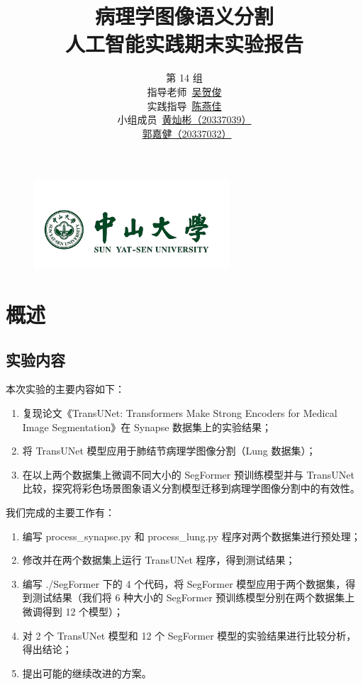\documentclass[hyperref,a4paper,UTF8]{ctexart}
\title{\vspace{3cm}\Huge\textbf{{病理学图像语义分割} \\ \LARGE{人工智能实践期末实验报告}}\vspace{6cm}}
\author{
\kaishu\Large{第 14 组} \\
\kaishu\Large{指导老师\ \underline{吴贺俊}} \\
\kaishu\Large{实践指导\ \underline{陈燕佳}} \\
\kaishu\Large{小组成员\ \underline{黄灿彬（20337039）}}\\
\kaishu\Large{\qquad\qquad\ \underline{郭嘉健（20337032）}} \\
}
\date{} %
\begin{document}
\begin{figure}
    \centering
    \includegraphics[width=0.65\textwidth]{figures/sysu.png}
\end{figure}

\maketitle

\newpage

\tableofcontents

\thispagestyle{empty} %
\newpage

\section{概述}

\subsection{实验内容}

本次实验的主要内容如下：

\begin{enumerate}[itemsep=2pt,topsep=0pt,parsep=0pt]
    \item 复现论文《TransUNet: Transformers Make Strong Encoders for Medical Image Segmentation》在 Synapse 数据集上的实验结果；
    \item 将 TransUNet 模型应用于肺结节病理学图像分割（Lung 数据集）；
    \item 在以上两个数据集上微调不同大小的 SegFormer 预训练模型并与 TransUNet 比较，探究将彩色场景图象语义分割模型迁移到病理学图像分割中的有效性。
\end{enumerate}

我们完成的主要工作有：

\begin{enumerate}[itemsep=2pt,topsep=0pt,parsep=0pt]
    \item 编写 process\_synapse.py 和 process\_lung.py 程序对两个数据集进行预处理；
    \item 修改并在两个数据集上运行 TransUNet 程序，得到测试结果；
    \item 编写 ./SegFormer 下的 4 个代码，将 SegFormer 模型应用于两个数据集，得到测试结果（我们将 6 种大小的 SegFormer 预训练模型分别在两个数据集上微调得到 12 个模型）；
    \item 对 2 个 TransUNet 模型和 12 个 SegFormer 模型的实验结果进行比较分析，得出结论；
    \item 提出可能的继续改进的方案。
\end{enumerate}
\end{document}
